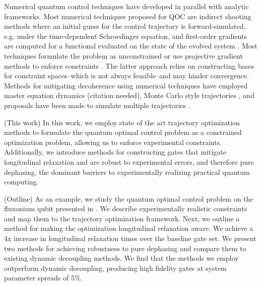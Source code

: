 \documentclass[
  amsfonts,
  amsmath,
  tbtags,
  amssymb,
  aps,
  nobibnotes,
  twocolumn,
]{revtex4-2}
\begin{document}
Numerical quantum control techniques have developed in parallel
with analytic frameworks.
Most numerical techniques proposed for QOC are indirect shooting
methods where an initial guess for the control trajectory is forward-simulated,
e.g. under the time-dependent Schroedinger equation,
and first-order gradients are computed for a functional evaluated
on the state of the evolved system \cite{leung2017speedup,  goerz2019krotov, doria2011optimal,
  abdelhafez2019gradient, machnes2015gradient, leng2019robust}.
Most techniques formulate the
problem as unconstrained or use
projective gradient methods to enforce constraints
\cite{machnes2015gradient}.
The latter approach relies on constructing
bases for constraint spaces--which is not always feasible--and
may hinder convergence. Methods for mitigating decoherence using numerical
techniques have employed master equation dynamics (citation needed),
Monte Carlo style trajectories \cite{abdelhafez2019gradient},
and proposals have been made to simulate multiple trajectories
\cite{reinhold2019controlling, rembold2020introduction}.

(This work) In this work, we employ state of the art
trajectory optimization methods
to formulate the quantum
optimal control problem as a constrained optimization problem, allowing
us to enforce experimental constraints.
Additionally,
we introduce methods for constructing gates that mitigate longitudinal
relaxation and are robust to experimental errors, and therefore
pure dephasing, the dominant barriers to experimentally
realizing practical quantum computing.

(Outline) As an example, we study the quantum optimal control problem on
the fluxonium qubit presented in \cite{zhang2020universal}.
We describe experimentally realistic constraints and map them to
the trajectory optimization framework. Next, we
outline a method for making the optimization longitudinal
relaxation aware. We achieve a 4x increase in longitudinal relaxation times
over the baseline gate set.
We present two methods for achieving robustness to pure dephasing
and compare them to existing dynamic decoupling methods. We find that
the methods we employ outperform dynamic decoupling, producing
high fidelity gates at system parameter spreads of $5\%$.


\end{document}
